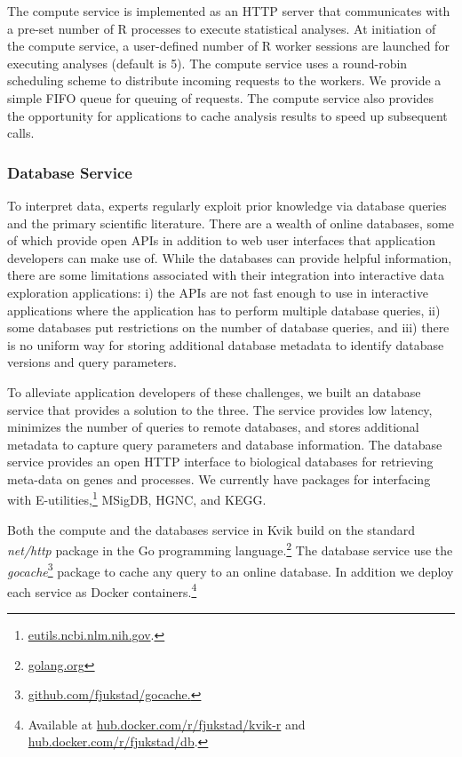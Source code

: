 The compute service is implemented as an HTTP server that communicates with a
pre-set number of R processes to execute statistical analyses. 
At initiation of the compute service, a user-defined number of R worker sessions
are launched for executing analyses (default is 5).  
The compute service uses a round-robin scheduling scheme to distribute incoming
requests to the workers. We provide a simple FIFO queue for queuing of requests.
The compute service also provides the opportunity for applications to cache
analysis results to speed up subsequent calls. 

\subsubsection*{Database Service} 
To interpret data, experts regularly exploit prior knowledge via database
queries and the primary scientific literature.  There are a wealth of online
databases, some of which provide open APIs in addition to web user interfaces
that application developers can make use of.  While the databases can provide
helpful information, there are some limitations associated with their
integration into interactive data exploration applications: 
i) the APIs are not fast enough to use in interactive applications where the
application has to perform multiple database queries, 
ii) some databases put restrictions on the number of database queries, and 
iii) there is no uniform way for storing additional database metadata to
identify database versions and query parameters. 

To alleviate application developers of these challenges, we built an database
service that provides a solution to the three. The service provides low latency,
minimizes the number of queries to remote databases, and stores additional
metadata to capture query parameters and database information. 
The database service provides an open HTTP interface to biological databases for
retrieving meta-data on genes and processes. 
We currently have packages for
interfacing with E-utilities,\footnote{\url{eutils.ncbi.nlm.nih.gov}.}
MSigDB, HGNC, and KEGG.

Both the compute and the databases service in Kvik build on the standard
\emph{net/http} package in the Go programming
language.\footnote{\url{golang.org}} The database service use
the \emph{gocache}\footnote{\url{github.com/fjukstad/gocache.}} package to cache
any query to an online database. In addition we deploy each service as Docker
containers.\footnote{Available at \url{hub.docker.com/r/fjukstad/kvik-r} and
\url{hub.docker.com/r/fjukstad/db}.}

